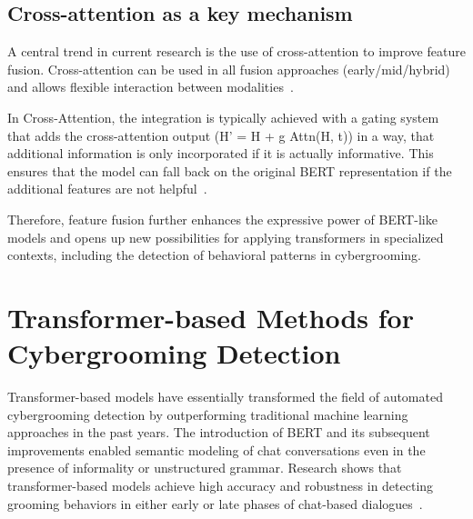\subsection{Cross-attention as a key mechanism}
A central trend in current research is the use of cross-attention to improve feature fusion. Cross-attention can be used in all fusion approaches (early/mid/hybrid) and allows flexible interaction between modalities~\cite{nagrani2021attention,khan2020mmft}. 
   
In Cross-Attention, the integration is typically achieved with a gating system that adds the cross-attention output (H' = H + g \odot Attn(H, t)) in a way, that additional information is only incorporated if it is actually informative. This ensures that the model can fall back on the original BERT representation if the additional features are not helpful~\cite{cai2025multimodal}.

Therefore, feature fusion further enhances the expressive power of BERT-like models and opens up new possibilities for applying transformers in specialized contexts, including the detection of behavioral patterns in cybergrooming.


\section{Transformer-based Methods for Cybergrooming Detection}

Transformer-based models have essentially transformed the field of automated cybergrooming detection by outperforming traditional machine learning approaches in the past years. The introduction of BERT and its subsequent improvements enabled semantic modeling of chat conversations even in the presence of informality or unstructured grammar. Research shows that transformer-based models achieve high accuracy and robustness in detecting grooming behaviors in either early or late phases of chat-based dialogues~\cite{vogt2021early,street2024grooming,borj2022online,hamm2025llms}.

